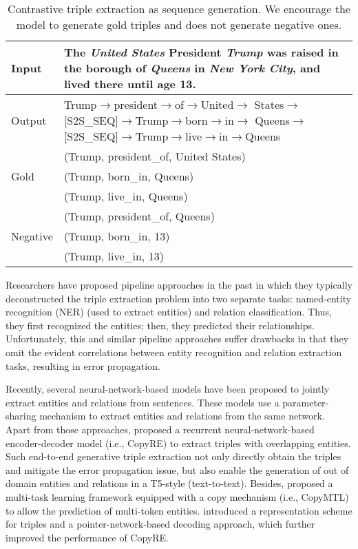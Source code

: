 \documentclass[letterpaper]{article} \usepackage{aaai21}  \usepackage{times}  \usepackage{helvet} \usepackage{courier}  \usepackage[hyphens]{url}  \usepackage{graphicx} \urlstyle{rm} \def\UrlFont{\rm}  \usepackage{natbib}  \usepackage[noend]{algpseudocode}
\begin{document}
\begin{table}[h] \centering
\begin{tabular}{l|p{6.5cm}}
 \toprule
    Input&  The \emph{United States} President \emph{Trump} was raised in the borough of \emph{Queens} in \emph{New York City}, and lived there until age 13.  \\
    \midrule
    Output& Trump$\rightarrow$president$\rightarrow$of$\rightarrow$United$\rightarrow$ States$\rightarrow$[S2S\_SEQ]$\rightarrow$Trump$\rightarrow$born$\rightarrow$in$\rightarrow$ Queens$\rightarrow$[S2S\_SEQ]$\rightarrow$Trump$\rightarrow$live$\rightarrow$in$\rightarrow$Queens \\
    \midrule
    \multirow{3}{*}{Gold}& (Trump, president\_of, United States)\\ &(Trump, born\_in, Queens) \\ &(Trump, live\_in, Queens) \\
    \midrule
    \multirow{3}{*}{Negative}& (Trump, president\_of, Queens)\\ &(Trump, born\_in, 13) \\ &(Trump, live\_in, 13) \\
 \bottomrule
\end{tabular}
\caption{Contrastive triple extraction  as sequence generation. We encourage the model to generate gold triples and does not generate negative ones.}
\label{nyt}
\end{table}

Researchers have proposed pipeline approaches in the past \cite{Lample2016NeuralAF,zeng2015distant} in which they typically deconstructed the triple extraction problem into two separate tasks: named-entity recognition (NER) (used to extract entities) and relation classification. Thus, they first recognized the entities; then, they predicted their relationships. Unfortunately, this and similar pipeline approaches suffer drawbacks \cite{roth2007global} in that they omit the evident correlations between entity recognition and relation extraction tasks, resulting in error propagation. 

Recently, several neural-network-based models \cite{zeng2018extracting} have been proposed to jointly extract entities and relations from sentences. These models use a parameter-sharing mechanism to extract entities and relations from the same network. Apart from those approaches, \citet{zeng-etal-2018-extracting} proposed a recurrent neural-network-based encoder-decoder model (i.e., CopyRE) to extract triples with overlapping entities. Such end-to-end generative triple extraction not only directly obtain the triples and mitigate the error propagation issue, but also enable the generation of out of domain entities and relations in a T5-style  \cite{raffel2019exploring} (text-to-text).  Besides, \citet{zeng2020copymtl} proposed a multi-task learning framework equipped with a copy mechanism (i.e., CopyMTL) to allow the prediction of multi-token entities. \citet{nayak2019effective} introduced a representation scheme for triples and a pointer-network-based decoding approach, which further improved the performance of CopyRE.
\end{document}
